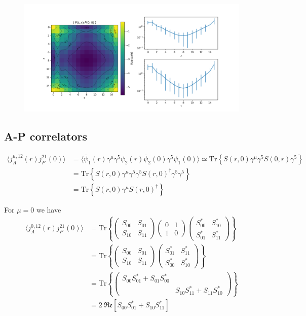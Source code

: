 \documentclass{article}
\newcommand{\Tr}[1]{\text{Tr}\left\{ #1 \right\}}
\renewcommand{\Re}[1]{\mathfrak{Re}\left[ #1 \right]}
\begin{document}
\begin{figure}[H]
    \centering
    \includegraphics[width=\textwidth]{../plots/PP.png}
    \caption{}
    \label{}
\end{figure}

\subsection{A-P correlators}

\begin{align*}
    \langle j_A^{\mu, 12} (r) j_P^{21}(0) \rangle &= \langle \bar\psi_1(r) \gamma^\mu \gamma^5 \psi_2(r) \bar\psi_2(0) \gamma^5 \psi_1(0) \rangle 
    \simeq \Tr{S(r, 0) \gamma^\mu \gamma^5 S(0, r) \gamma^5} \\
    &= \Tr{S(r, 0) \gamma^\mu \gamma^5 \gamma^5 S(r, 0)^\dagger \gamma^5 \gamma^5} \\
    &= \Tr{S(r, 0) \gamma^\mu S(r, 0)^\dagger}
\end{align*}

For $\mu = 0$ we have
\begin{align*}
    \langle j_A^{0, 12} (r) j_P^{21}(0) \rangle 
    &= \Tr{ \begin{pmatrix} S_{00} & S_{01} \\ S_{10} & S_{11} \end{pmatrix} \begin{pmatrix} 0 & 1 \\ 1 & 0 \end{pmatrix} \begin{pmatrix} S_{00}^* & S_{10}^* \\ S_{01}^* & S_{11}^* \end{pmatrix} } \\
    &= \Tr{ \begin{pmatrix} S_{00} & S_{01} \\ S_{10} & S_{11} \end{pmatrix} \begin{pmatrix} S_{01}^* & S_{11}^* \\ S_{00}^* & S_{10}^* \end{pmatrix}} \\
    &= \Tr{\begin{pmatrix} S_{00} S_{01}^* + S_{01} S_{00}^* &  \\ & S_{10} S_{11}^* + S_{11} S_{10}^* \end{pmatrix}} \\
    &= 2 \ \Re{S_{00} S_{01}^* + S_{10} S_{11}^*}
\end{align*}
\end{document}
